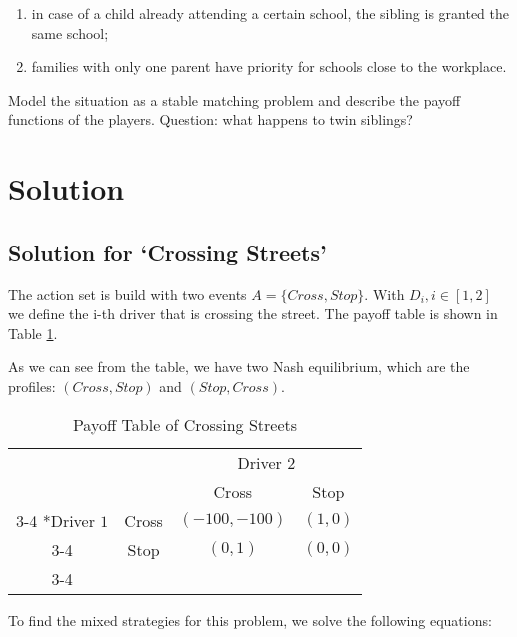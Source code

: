 \documentclass{article}
\begin{document}
\begin{enumerate}
    \item in case of a child already attending a certain school, the sibling is granted the same school; 
    \item families with only one parent have priority for schools close to the workplace.
\end{enumerate}

\noindent Model the situation as a stable matching problem and describe the payoff functions of the players. Question: what happens to twin siblings?  

\section{Solution}

\subsection{Solution for `Crossing Streets'}

The action set is build with two events $A= \{\textit{Cross}, \textit{Stop}\}$. With $D_i, i \in [1, 2]$ we define the i-th driver that is crossing the street.
The payoff table is shown in Table \ref{tbl:payoff1}.

\noindent As we can see from the table, we have two Nash equilibrium, which are the profiles: $(\textit{Cross}, \textit{Stop})$ and $(\textit{Stop}, \textit{Cross})$.\\

\begin{table}[h!]
    \setlength{\extrarowheight}{2pt}
    \label{tbl:payoff1}
    \begin{center}
        \begin{tabular}{cc|c|c|}
            & \multicolumn{1}{c}{} & \multicolumn{2}{c}{Driver $2$}\\
            & \multicolumn{1}{c}{} & \multicolumn{1}{c}{Cross}  & \multicolumn{1}{c}{Stop} \\\cline{3-4}
            \multirow{2}*{Driver $1$}  & Cross & $(-100,-100)$ & $(1,0)$ \\\cline{3-4}
            & Stop & $(0,1)$ & $(0,0)$ \\\cline{3-4}
        \end{tabular}
    \end{center}
    \caption{Payoff Table of Crossing Streets}
\end{table}

\noindent To find the mixed strategies for this problem, we solve the following equations:
\end{document}
